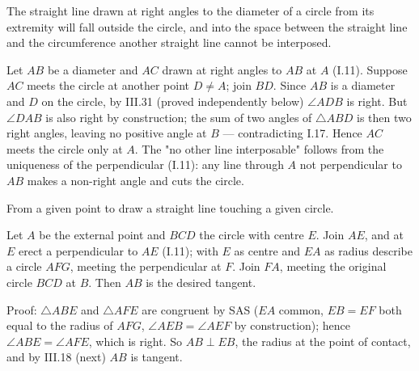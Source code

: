 \begin{claim}
\label{prop:III.16}
The straight line drawn at right angles to the diameter of a circle
from its extremity will fall outside the circle, and into the space
between the straight line and the circumference another straight
line cannot be interposed.
\end{claim}
\begin{evidence}
\label{ev:III.16}
Let $AB$ be a diameter and $AC$ drawn at right angles to $AB$ at
$A$ (I.11).  Suppose $AC$ meets the circle at another point $D
\neq A$; join $BD$.  Since $AB$ is a diameter and $D$ on the
circle, by III.31 (proved independently below) $\angle ADB$ is
right.  But $\angle DAB$ is also right by construction; the sum of
two angles of $\triangle ABD$ is then two right angles, leaving no
positive angle at $B$ --- contradicting I.17.  Hence $AC$ meets the
circle only at $A$.  The "no other line interposable" follows from
the uniqueness of the perpendicular (I.11): any line through $A$
not perpendicular to $AB$ makes a non-right angle and cuts the
circle.
\end{evidence}

\begin{claim}
\label{prop:III.17}
From a given point to draw a straight line touching a given circle.
\end{claim}
\begin{evidence}
\label{ev:III.17}
Let $A$ be the external point and $BCD$ the circle with centre $E$.
Join $AE$, and at $E$ erect a perpendicular to $AE$ (I.11); with
$E$ as centre and $EA$ as radius describe a circle $AFG$, meeting
the perpendicular at $F$.  Join $FA$, meeting the original circle
$BCD$ at $B$.  Then $AB$ is the desired tangent.

Proof: $\triangle ABE$ and $\triangle AFE$ are congruent by SAS
($EA$ common, $EB = EF$ both equal to the radius of $AFG$,
$\angle AEB = \angle AEF$ by construction); hence $\angle ABE =
\angle AFE$, which is right.  So $AB \perp EB$, the radius at the
point of contact, and by III.18 (next) $AB$ is tangent.
\end{evidence}

